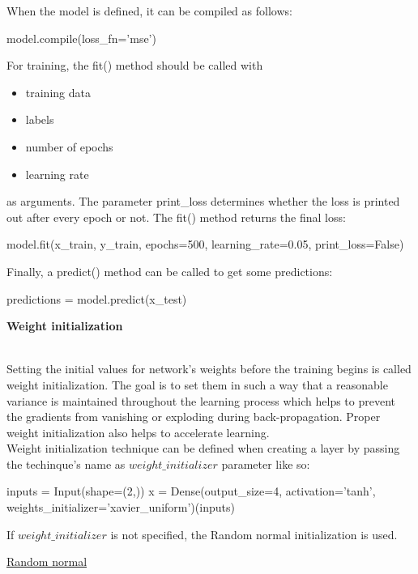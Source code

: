 \documentclass{article}
\begin{document}
When the model is defined, it can be compiled as follows:
\begin{python}
model.compile(loss_fn='mse')
\end{python}

For training, the fit() method should be called with 
\begin{itemize}
    \item training data
    \item labels 
    \item number of epochs
    \item learning rate
\end{itemize}
as arguments. The parameter print\_loss determines whether the loss is printed out 
after every epoch or not. The fit() method returns the final loss:
\begin{python}
model.fit(x_train,
          y_train,
          epochs=500,
          learning_rate=0.05,
          print_loss=False)
\end{python}
Finally, a predict() method can be called to get some predictions:
\begin{python}
predictions = model.predict(x_test)
\end{python}
    \clearpage
    
\hypertarget{weight_initialization}{\textbf{Weight initialization}} \\

Setting the initial values for network's weights before the training begins is called weight 
initialization. The goal is to set them in such a way that a reasonable variance is maintained throughout 
the learning process which helps to prevent the gradients from vanishing or exploding during back-propagation. 
Proper weight initialization also helps to accelerate learning. \\

Weight initialization technique can be defined when creating a layer by passing 
the techinque's name as $weight\_initializer$ parameter like so:
\begin{python}
inputs = Input(shape=(2,))
x = Dense(output_size=4,
            activation='tanh',
            weights_initializer='xavier_uniform')(inputs)
\end{python}

If $weight\_initializer$ is not specified, the Random normal initialization is used.
\pagebreak

\hypertarget{initialization_random_normal}{\underline{Random normal}} \\
\end{document}
